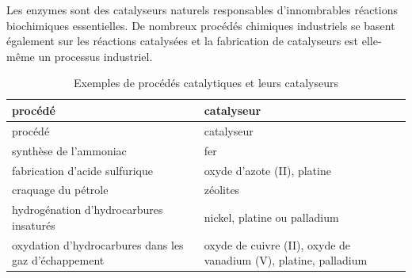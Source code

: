 \documentclass[
  11pt,
  french,
  a4paper,
  openany]{book}
\begin{document}
\newpage

Les enzymes sont des catalyseurs naturels responsables d'innombrables réactions biochimiques essentielles. De nombreux procédés chimiques industriels se basent également sur les réactions catalysées et la fabrication de catalyseurs est elle-même un processus industriel.

\begin{longtable}[]{@{}ll@{}}
\caption{\label{tab:tab-catalyseurs} Exemples de procédés catalytiques et leurs catalyseurs}\tabularnewline
\toprule
\begin{minipage}[b]{0.47\columnwidth}\raggedright
procédé\strut
\end{minipage} & \begin{minipage}[b]{0.47\columnwidth}\raggedright
catalyseur\strut
\end{minipage}\tabularnewline
\midrule
\endfirsthead
\toprule
\begin{minipage}[b]{0.47\columnwidth}\raggedright
procédé\strut
\end{minipage} & \begin{minipage}[b]{0.47\columnwidth}\raggedright
catalyseur\strut
\end{minipage}\tabularnewline
\midrule
\endhead
\begin{minipage}[t]{0.47\columnwidth}\raggedright
synthèse de l'ammoniac\strut
\end{minipage} & \begin{minipage}[t]{0.47\columnwidth}\raggedright
fer\strut
\end{minipage}\tabularnewline
\begin{minipage}[t]{0.47\columnwidth}\raggedright
fabrication d'acide sulfurique\strut
\end{minipage} & \begin{minipage}[t]{0.47\columnwidth}\raggedright
oxyde d'azote (II), platine\strut
\end{minipage}\tabularnewline
\begin{minipage}[t]{0.47\columnwidth}\raggedright
craquage du pétrole\strut
\end{minipage} & \begin{minipage}[t]{0.47\columnwidth}\raggedright
zéolites\strut
\end{minipage}\tabularnewline
\begin{minipage}[t]{0.47\columnwidth}\raggedright
hydrogénation d'hydrocarbures insaturés\strut
\end{minipage} & \begin{minipage}[t]{0.47\columnwidth}\raggedright
nickel, platine ou palladium\strut
\end{minipage}\tabularnewline
\begin{minipage}[t]{0.47\columnwidth}\raggedright
oxydation d'hydrocarbures dans les gaz d'échappement\strut
\end{minipage} & \begin{minipage}[t]{0.47\columnwidth}\raggedright
oxyde de cuivre (II), oxyde de vanadium (V), platine, palladium\strut
\end{minipage}\tabularnewline
\bottomrule
\end{longtable}
\end{document}
